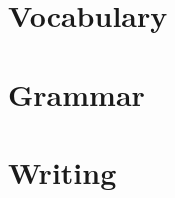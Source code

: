 \documentclass[a4paper]{article}
\begin{document}
\section{Vocabulary}

\section{Grammar}

\section{Writing}
\end{document}
